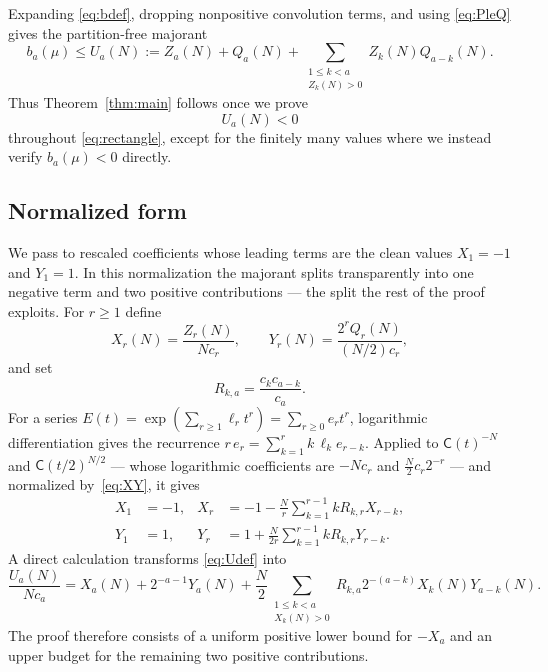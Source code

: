 \documentclass[11pt]{article}
\theoremstyle{definition}
\theoremstyle{remark}
\newcommand{\C}{\mathsf C}
\begin{document}
Expanding \eqref{eq:bdef}, dropping nonpositive convolution terms, and using
\eqref{eq:PleQ} gives the partition-free majorant
\begin{equation}\label{eq:Udef}
 b_a(\mu)\le U_a(N):=Z_a(N)+Q_a(N)+
   \sum_{\substack{1\le k<a\\Z_k(N)>0}}Z_k(N)Q_{a-k}(N).
\end{equation}
Thus Theorem~\ref{thm:main} follows once we prove
\begin{equation}\label{eq:Uneg}
  U_a(N)<0
\end{equation}
throughout \eqref{eq:rectangle}, except for the finitely many values where we
instead verify $b_a(\mu)<0$ directly.

\subsection{Normalized form}

We pass to rescaled coefficients whose leading terms are the clean values
$X_1=-1$ and $Y_1=1$.  In this normalization the majorant splits transparently
into one negative term and two positive contributions --- the split the rest of
the proof exploits.  For $r\ge1$ define
\begin{equation}\label{eq:XY}
  X_r(N)=\frac{Z_r(N)}{Nc_r},
  \qquad
  Y_r(N)=\frac{2^rQ_r(N)}{(N/2)c_r},
\end{equation}
and set
\begin{equation}\label{eq:R}
  R_{k,a}=\frac{c_kc_{a-k}}{c_a}.
\end{equation}
For a series $E(t)=\exp(\sum_{r\ge1}\ell_rt^r)=\sum_{r\ge0}e_rt^r$, logarithmic
differentiation gives the recurrence $r\,e_r=\sum_{k=1}^rk\,\ell_ke_{r-k}$.
Applied to $\C(t)^{-N}$ and $\C(t/2)^{N/2}$ --- whose logarithmic coefficients
are $-Nc_r$ and $\tfrac N2c_r2^{-r}$ --- and normalized by~\eqref{eq:XY}, it
gives
\begin{align}
  X_1&=-1,&
  X_r&=-1-\frac Nr\sum_{k=1}^{r-1}kR_{k,r}X_{r-k},
  \label{eq:Xrec}\\
  Y_1&=1,&
  Y_r&=1+\frac N{2r}\sum_{k=1}^{r-1}kR_{k,r}Y_{r-k}.
  \label{eq:Yrec}
\end{align}
A direct calculation transforms \eqref{eq:Udef} into
\begin{equation}\label{eq:Unorm}
 \frac{U_a(N)}{Nc_a}
  =X_a(N)+2^{-a-1}Y_a(N)
   +\frac N2\sum_{\substack{1\le k<a\\X_k(N)>0}}
      R_{k,a}2^{-(a-k)}X_k(N)Y_{a-k}(N).
\end{equation}
The proof therefore consists of a uniform positive lower bound for $-X_a$
and an upper budget for the remaining two positive contributions.
\end{document}
